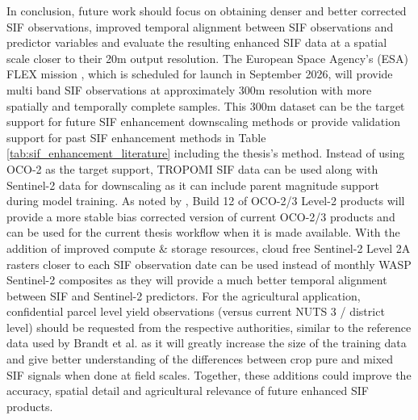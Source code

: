 In conclusion, future work should focus on obtaining denser and better corrected SIF observations, improved temporal alignment between SIF observations and predictor variables and evaluate the resulting enhanced SIF data at a spatial scale closer to their 20m output resolution. The European Space Agency's (ESA) FLEX mission \cite{coppo2017fluorescence, drusch2016fluorescence}, which is scheduled for launch in September 2026, will provide multi band SIF observations at approximately 300m resolution with more spatially and temporally complete samples. This 300m dataset can be the target support for future SIF enhancement downscaling methods or provide validation support for past SIF enhancement methods in Table \ref{tab:sif_enhancement_literature} including the thesis's method. Instead of using OCO-2 as the target support, TROPOMI SIF data can be used along with Sentinel-2 data for downscaling as it can include parent magnitude support during model training. As noted by \cite{sanghavi2025impact}, Build 12 of OCO-2/3 Level-2 products will provide a more stable bias corrected version of current OCO-2/3 products and can be used for the current thesis workflow when it is made available. With the addition of improved compute \& storage resources, cloud free Sentinel-2 Level 2A rasters closer to each SIF observation date can be used instead of monthly WASP Sentinel-2 composites as they will provide a much better temporal alignment between SIF and Sentinel-2 predictors. For the agricultural application, confidential parcel level yield observations (versus current NUTS 3 / district level) should be requested from the respective authorities, similar to the reference data used by Brandt et al. \cite{brandt2024ensemble} as it will greatly increase the size of the training data and give better understanding of the differences between crop pure and mixed SIF signals when done at field scales. Together, these additions could improve the accuracy, spatial detail and agricultural relevance of future enhanced SIF products.